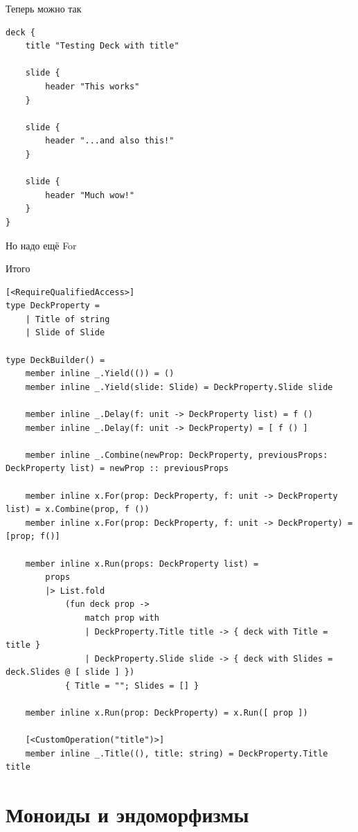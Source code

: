\documentclass{../../slides-style}
\begin{document}
    \begin{frame}[fragile]{Теперь можно так}
        \begin{verbatim}
deck {
    title "Testing Deck with title"

    slide {
        header "This works"
    }

    slide {
        header "...and also this!"
    }

    slide {
        header "Much wow!"
    }
}
        \end{verbatim}
        Но надо ещё For
    \end{frame}

    \begin{frame}[fragile]{Итого}
        \begin{ssmall}
            \begin{verbatim}
[<RequireQualifiedAccess>]
type DeckProperty =
    | Title of string
    | Slide of Slide

type DeckBuilder() =
    member inline _.Yield(()) = ()
    member inline _.Yield(slide: Slide) = DeckProperty.Slide slide

    member inline _.Delay(f: unit -> DeckProperty list) = f ()
    member inline _.Delay(f: unit -> DeckProperty) = [ f () ]

    member inline _.Combine(newProp: DeckProperty, previousProps: DeckProperty list) = newProp :: previousProps

    member inline x.For(prop: DeckProperty, f: unit -> DeckProperty list) = x.Combine(prop, f ())
    member inline x.For(prop: DeckProperty, f: unit -> DeckProperty) = [prop; f()]

    member inline x.Run(props: DeckProperty list) =
        props
        |> List.fold
            (fun deck prop ->
                match prop with
                | DeckProperty.Title title -> { deck with Title = title }
                | DeckProperty.Slide slide -> { deck with Slides = deck.Slides @ [ slide ] })
            { Title = ""; Slides = [] }

    member inline x.Run(prop: DeckProperty) = x.Run([ prop ])

    [<CustomOperation("title")>]
    member inline _.Title((), title: string) = DeckProperty.Title title
            \end{verbatim}
        \end{ssmall}
    \end{frame}

    \section{Моноиды и эндоморфизмы}
\end{document}
